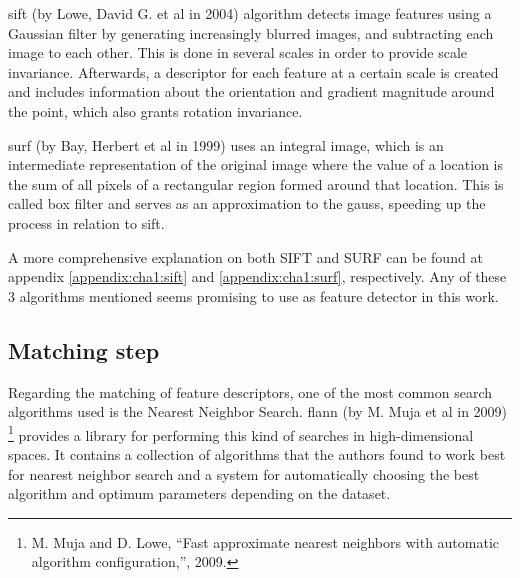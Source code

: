 \acrshort{sift} (by Lowe, David G. et al in 2004) \cite{sift} algorithm detects image features using a Gaussian filter by generating increasingly blurred images, and subtracting each image to each other. This is done in several scales in order to provide scale invariance. Afterwards, a descriptor for each feature at a certain scale is created and includes information about the orientation and gradient magnitude around the point, which also grants rotation invariance.

\acrshort{surf} (by Bay, Herbert et al in 1999) \cite{surf} uses an integral image, which is an intermediate representation of the original image where the value of a location is the sum of all pixels of a rectangular region formed around that location. This is called box filter and serves as an approximation to the \gls{gauss}, speeding up the process in relation to \acrshort{sift}.

A more comprehensive explanation on both SIFT and SURF can be found at appendix \ref{appendix:cha1:sift} and \ref{appendix:cha1:surf}, respectively. Any of these 3 algorithms mentioned seems promising to use as feature detector in this work.

\subsection{Matching step}
Regarding the matching of feature descriptors, one of the most common search algorithms used is the Nearest Neighbor Search. \acrfull{flann} (by M. Muja et al in 2009) \footnote{M. Muja and D. Lowe, “Fast approximate nearest neighbors with automatic algorithm configuration,”, 2009.} provides a library for performing this kind of searches in high-dimensional spaces. It contains a collection of algorithms that the authors found to  work best for nearest neighbor search and a system for automatically choosing the best algorithm and optimum parameters depending on the dataset.

